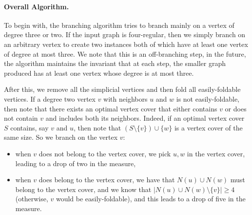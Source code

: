 \documentclass[svgnames]{llncs}
\begin{document}

\paragraph{Overall Algorithm.} To begin with, the branching algorithm tries to branch mainly on a vertex of degree three or two. If the input graph is four-regular, 
then we simply branch on an arbitrary vertex to create two instances both of which have at least one vertex of degree at most three. We note that this is 
an off-branching step, in the future, the algorithm maintains the invariant that at each step, the smaller graph produced has at least one vertex whose degree is at most three. 





\longversion{



}


After this, we remove all the simplicial vertices and then fold all easily-foldable vertices. If a degree two vertex $v$ with neighbors $u$ and $w$ is not easily-foldable,
then note that there exists an optimal vertex cover that either contains $v$ or does not contain $v$ and includes both its neighbors. 
Indeed, if an optimal vertex cover $S$ contains, say $v$ and $u$, then note that $(S \setminus \{v\}) \cup \{w\}$ is a vertex cover of the same size. So we branch on the vertex $v$:

\begin{itemize}
\item when $v$ does not belong to the vertex cover, we pick $u,w$ in the vertex cover, leading to a drop of two in the measure,
\item when $v$ does belong to the vertex cover, we have that $N(u) \cup N(w)$ must belong to the vertex cover,
and we know that $|N(u) \cup N(w) \setminus \{v\}| \geq 4$ (otherwise, $v$ would be easily-foldable), and this leads to a drop of five in the measure. 
\end{itemize}
\end{document}
